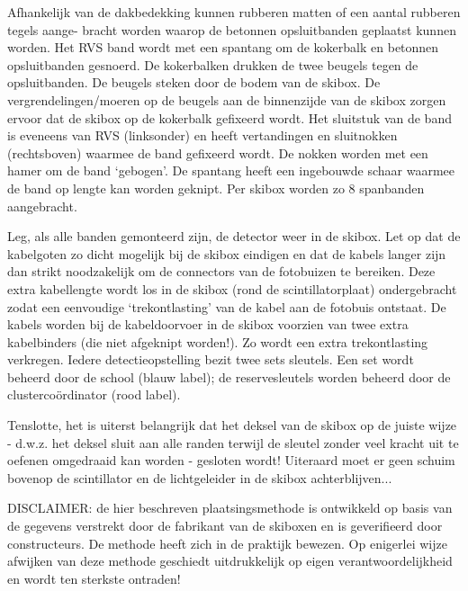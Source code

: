 Afhankelijk van de dakbedekking kunnen rubberen matten of een aantal
rubberen tegels aange- bracht worden waarop de betonnen opsluitbanden
geplaatst kunnen worden. Het RVS band wordt met een spantang om de
kokerbalk en betonnen opsluitbanden gesnoerd. De kokerbalken drukken de
twee beugels tegen de opsluitbanden. De beugels steken door de bodem van
de skibox. De vergrendelingen/moeren op de beugels aan de binnenzijde
van de skibox zorgen ervoor dat de skibox op de kokerbalk gefixeerd
wordt. Het sluitstuk van de band is eveneens van RVS (linksonder) en
heeft vertandingen en sluitnokken (rechtsboven) waarmee de band
gefixeerd wordt. De nokken worden met een hamer om de band ‘gebogen’. De
spantang heeft een ingebouwde schaar waarmee de band op lengte kan
worden geknipt. Per skibox worden zo 8 spanbanden aangebracht.

Leg, als alle banden gemonteerd zijn, de detector weer in de skibox. Let
op dat de kabelgoten zo dicht mogelijk bij de skibox eindigen en dat de
kabels langer zijn dan strikt noodzakelijk om de connectors van de
fotobuizen te bereiken. Deze extra kabellengte wordt los in de skibox
(rond de scintillatorplaat) ondergebracht zodat een
eenvoudige ‘trekontlasting’ van de kabel aan de fotobuis ontstaat. De
kabels worden bij de kabeldoorvoer in de skibox voorzien van twee extra
kabelbinders (die niet afgeknipt worden!). Zo wordt een extra
trekontlasting verkregen. Iedere detectieopstelling bezit twee sets
sleutels. Een set wordt beheerd door de school (blauw label); de
reservesleutels worden beheerd door de clustercoördinator (rood label).

Tenslotte, het is uiterst belangrijk dat het deksel van de skibox op de
juiste wijze - d.w.z. het deksel sluit aan alle randen terwijl de
sleutel zonder veel kracht uit te oefenen omgedraaid kan worden -
gesloten wordt! Uiteraard moet er geen schuim bovenop de
scintillator en de lichtgeleider in de skibox achterblijven...

DISCLAIMER: de hier beschreven plaatsingsmethode is ontwikkeld op basis
van de gegevens verstrekt door de fabrikant van de skiboxen en is
geverifieerd door constructeurs. De methode heeft zich in de praktijk
bewezen. Op enigerlei wijze afwijken van deze methode geschiedt
uitdrukkelijk op eigen verantwoordelijkheid en wordt ten sterkste
ontraden!



